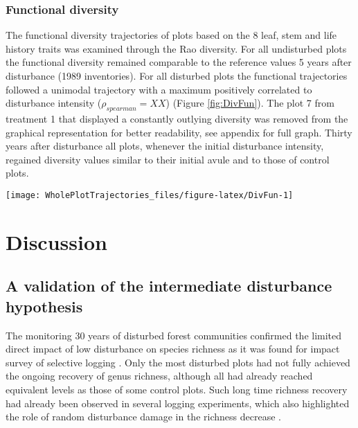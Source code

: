 \documentclass[fleqn,10pt]{ArtEcoFoG} %
\theoremstyle{definition}
\theoremstyle{definition}
\theoremstyle{definition}
\theoremstyle{remark}
\begin{document}
\subsubsection{Functional diversity}\label{functional-diversity}

The functional diversity trajectories of plots based on the 8 leaf, stem
and life history traits was examined through the Rao diversity. For all
undisturbed plots the functional diversity remained comparable to the
reference values 5 years after disturbance (1989 inventories). For all
disturbed plots the functional trajectories followed a unimodal
trajectory with a maximum positively correlated to disturbance intensity
(\(\rho_{spearman}=XX\)) (Figure \ref{fig:DivFun}). The plot 7 from
treatment 1 that displayed a constantly outlying diversity was removed
from the graphical representation for better readability, see appendix
for full graph. Thirty years after disturbance all plots, whenever the
initial disturbance intensity, regained diversity values similar to
their initial avule and to those of control plots.

\begin{figure*}

{\centering \texttt{[image: WholePlotTrajectories\_files/figure-latex/DivFun-1]} 

}

\caption{Trajectories of the Rao functional diversity over 30 years after disturbance. Trajectories correspond to the median (solid line) and 0.025 and 0.975 percentile (gray envelope) observed after 50 iteration of the taxonomic uncertainty propagation. Initial treatments are represented by solid lines colorswith green for control, blue for T1,orange for T2 and red for T3.and the missing trait value filling processes.}\label{fig:DivFun}
\end{figure*}

\section{Discussion}\label{discussion}

\subsection{A validation of the intermediate disturbance
hypothesis}\label{a-validation-of-the-intermediate-disturbance-hypothesis}

The monitoring 30 years of disturbed forest communities confirmed the
limited direct impact of low disturbance on species richness as it was
found for impact survey of selective logging
\citep{Cannon1998, Baraloto2012a}. Only the most disturbed plots had not
fully achieved the ongoing recovery of genus richness, although all had
already reached equivalent levels as those of some control plots. Such
long time richness recovery had already been observed in several logging
experiments, which also highlighted the role of random disturbance
damage in the richness decrease \citep{DeAvila2015, Hu2018}.
\end{document}
